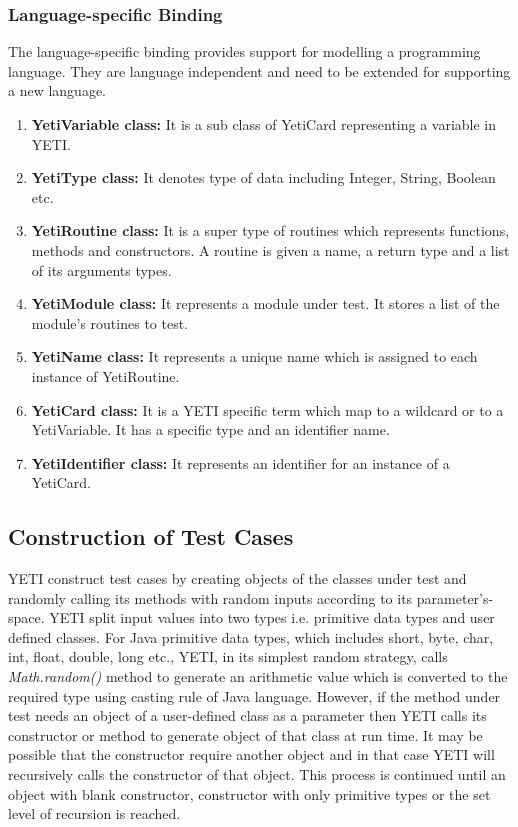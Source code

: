 \subsubsection{Language-specific Binding}
The language-specific binding provides support for modelling a programming language. They are language independent and need to be extended for supporting a new language.
\begin{enumerate}
\item {\textbf{YetiVariable class:}} It is a sub class of YetiCard representing a variable in YETI.
\item {\textbf{YetiType class:}} It denotes type of data including Integer, String, Boolean etc.
\item {\textbf{YetiRoutine class:}} It is a super type of routines which represents functions, methods and constructors. A routine is given a name, a return type and a list of its arguments types.
\item {\textbf{YetiModule class:}} It represents a module under test. It stores a list of the module’s routines to test. 
\item {\textbf{YetiName class:}} It represents a unique name which is assigned to each instance of YetiRoutine.
\item {\textbf{YetiCard class:}} It is a YETI specific term which map to a wildcard or to a YetiVariable. It has a specific type and an identifier name.
\item {\textbf{YetiIdentifier class:}} It represents an identifier for an instance of a YetiCard.
\end{enumerate}

\subsection{Construction of Test Cases}
YETI construct test cases by creating objects of the classes under test and randomly calling its methods with random inputs according to its parameter's-space. YETI split input values into two types i.e. primitive data types and user defined classes. For Java primitive data types, which includes short, byte, char, int, float, double, long etc., YETI, in its simplest random strategy, calls {\it Math.random()} method to generate an arithmetic value which is converted to the required type using casting rule of Java language. However, if the method under test needs an object of a user-defined class as a parameter then YETI calls its constructor or method to generate object of that class at run time. It may be possible that the constructor require another object and in that case YETI will recursively calls the constructor of that object. This process is continued until an object with blank constructor, constructor with only primitive types or the set level of recursion is reached.

